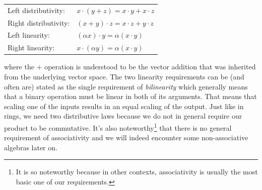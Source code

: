 \label{Def:ProductAxioms}  %
\medskip
\begin{tabular}{l l}
Left distributivity:  & $x \cdot (y+z) = x \cdot y + x \cdot z$     \\	
Right distributivity: & $(x+y) \cdot z = x \cdot z + y \cdot z$     \\
Left linearity:       & $(\alpha x) \cdot y = \alpha (x \cdot y)$   \\
Right linearity:      & $x \cdot (\alpha y) = \alpha (x \cdot y)$
\end{tabular}
\medskip

where the $+$ operation is understood to be the vector addition that was inherited from the underlying vector space. The two linearity requirements can be (and often are) stated as the single requirement of \emph{bilinearity} which generally means that a binary operation must be linear in both of its arguments. That means that scaling one of the inputs results in an equal scaling of the output. Just like in rings, we need two distributive laws because we do not in general require our product to be commutative. It's also noteworthy\footnote{It is so noteworthy because in other contexts, associativity is usually the most basic one of our requirements.} that there is no general requirement of associativity and we will indeed encounter some non-associative algebras later on.







